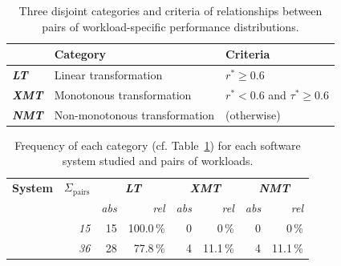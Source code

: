 {{\begin{table}
	\footnotesize
	\caption{Three disjoint categories and criteria of relationships between pairs of workload-specific performance distributions.}
	\centering
\begin{tabular}{lp{4.1cm}p{2.8cm}}	
	\toprule
	 \textbf{} & \textbf{Category} & \textbf{Criteria}\\
	 \midrule
	 \rowcolor{lt-color!40!white}\cellcolor{lt-color}\textit{\textbf{LT}} & {Linear transformation} & $r^* \geq 0.6$ \\
	\rowcolor{xmt-color!40!white}\cellcolor{xmt-color}\textit{\textbf{XMT}} & {Monotonous transformation} & $r^* < 0.6 $ and $ \tau^* \geq 0.6$ \\
	\rowcolor{nmt-color!40!white}\cellcolor{nmt-color}\textit{\textbf{NMT}} & {Non-monotonous transformation}  & (otherwise) \\%
	\bottomrule
\end{tabular}
\label{tab:categorization}
\end{table}

\begin{table}
	\footnotesize
	\centering
	\caption{Frequency of each category (cf. Table~\ref{tab:categorization}) for each software system studied and pairs of workloads.}
\begin{tabular}{p{1.1cm}rrrrrrr}	
	\toprule
	\textbf{System} & \textbf{$\Sigma_\text{pairs}$} & \multicolumn{2}{c}{\textbf{\cellcolor{lt-color}\textit{LT}}} & \multicolumn{2}{c}{\textbf{\cellcolor{xmt-color}\textit{XMT}}} & \multicolumn{2}{c}{\textbf{\cellcolor{nmt-color}\textit{NMT}}}\\
	  & & \textit{abs} &\textit{rel} & \textit{abs} & \textit{rel}& \textit{abs} & \textit{rel}\\
	\midrule
	
	\jumper & \textit{15} &
	\cellcolor{lt-color!100!white}15 & \cellcolor{lt-color!100!white}100.0\,\% & 
	0 & 0\,\% & 
	0 & 0\,\%\\
	
	\kanzi & \textit{36} &
	\cellcolor{lt-color!78!white}28 & \cellcolor{lt-color!78!white}77.8\,\% & 
	\cellcolor{xmt-color!11!white}	4& \cellcolor{xmt-color!11!white}11.1\,\% & 
	\cellcolor{nmt-color!11!white}4 & \cellcolor{nmt-color!11!white}11.1\,\%\\
	

\end{tabular}
\end{table}}}
